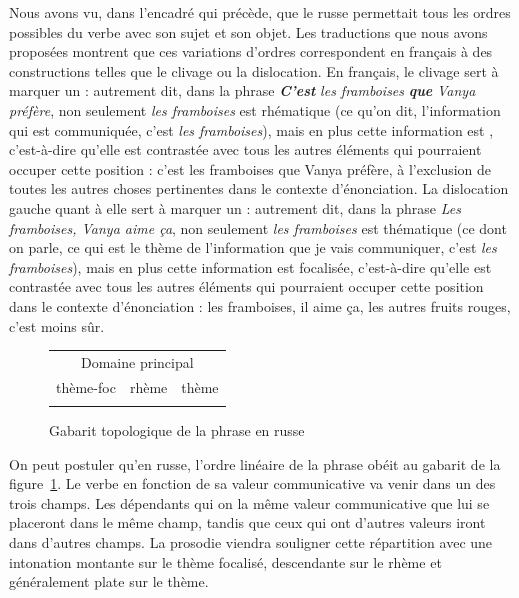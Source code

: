 {    Nous avons vu, dans l’encadré qui précède, que le russe permettait tous les ordres possibles du verbe avec son sujet et son objet. Les traductions que nous avons proposées montrent que ces variations d’ordres correspondent en français à des constructions telles que le clivage ou la dislocation. En français, le clivage sert à marquer un  : autrement dit, dans la phrase \textbf{\textit{C’est}} \textit{les framboises} \textbf{\textit{que}} \textit{Vanya préfère}, non seulement \textit{les framboises} est rhématique (ce qu’on dit, l’information qui est communiquée, c’est \textit{les framboises}), mais en plus cette information est , c’est-à-dire qu’elle est contrastée avec tous les autres éléments qui pourraient occuper cette position : c’est les framboises que Vanya préfère, à l’exclusion de toutes les autres choses pertinentes dans le contexte d’énonciation. La dislocation gauche quant à elle sert à marquer un  : autrement dit, dans la phrase \textit{Les framboises, Vanya aime ça}, non seulement \textit{les framboises} est thématique (ce dont on parle, ce qui est le thème de l’information que je vais communiquer, c’est \textit{les framboises}), mais en plus cette information est focalisée, c’est-à-dire qu’elle est contrastée avec tous les autres éléments qui pourraient occuper cette position dans le contexte d’énonciation : les framboises, il aime ça, les autres fruits rouges, c’est moins sûr.

    
    \begin{figure}[H]
    \caption{Gabarit topologique de la phrase en russe\label{fig:topo-russe}}
    \begin{tabular}{|c|c|c|}
     \hline
    \multicolumn{3}{|c|}{\cellcolor{lsDOIGray}Domaine principal}\\
    \hhline{---}
    thème-foc & rhème & thème\\
    \hhline{---}
    \end{tabular}
    \end{figure}

    On peut postuler qu’en russe, l’ordre linéaire de la phrase obéit au gabarit de la figure~\ref{fig:topo-russe}.
    Le verbe en fonction de sa valeur communicative va venir dans un des trois champs. Les dépendants qui on la même valeur communicative que lui se placeront dans le même champ, tandis que ceux qui ont d’autres valeurs iront dans d’autres champs. La prosodie viendra souligner cette répartition avec une intonation montante sur le thème focalisé, descendante sur le rhème et généralement plate sur le thème.

}

